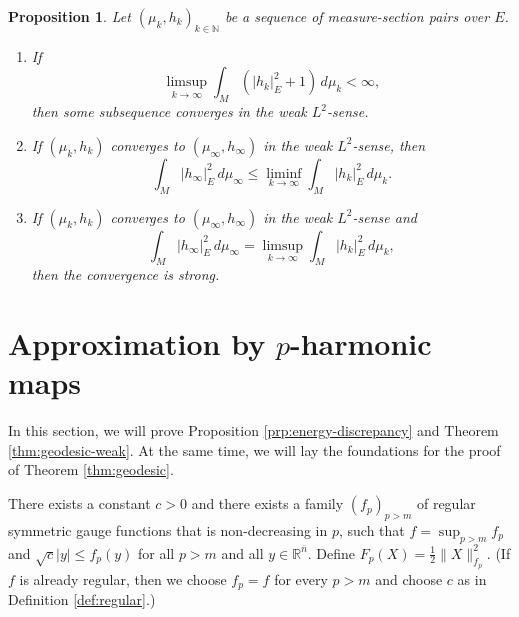\documentclass[10pt,a4paper]{amsart}
\newcommand{\R}{\mathbb{R}}
\newcommand{\N}{\mathbb{N}}
\newcommand{\ndim}{{\bar{n}}}
\newtheorem{proposition}[theorem]{Proposition}
\begin{document}
\begin{proposition} \label{prp:Hutchinson}
Let $(\mu_k, h_k)_{k \in \N}$ be a sequence of measure-section pairs over $E$.
\begin{enumerate}
\item If
\[
\limsup_{k \to \infty} \int_M (|h_k|_E^2 + 1) \, d\mu_k < \infty,
\]
then some subsequence converges in the weak $L^2$-sense.
\item If $(\mu_k, h_k)$ converges to $(\mu_\infty, h_\infty)$ in the weak
$L^2$-sense, then
\[
\int_M |h_\infty|_E^2 \, d\mu_\infty \le \liminf_{k \to \infty} \int_M |h_k|_E^2 \, d\mu_k.
\]
\item If $(\mu_k, h_k)$ converges to $(\mu_\infty, h_\infty)$ in the weak
$L^2$-sense and
\[
\int_M |h_\infty|_E^2 \, d\mu_\infty = \limsup_{k \to \infty} \int_M |h_k|_E^2 \, d\mu_k,
\]
then the convergence is strong.
\end{enumerate}
\end{proposition}















\section{Approximation by $p$-harmonic maps} \label{sct:construction}

In this section, we will prove Proposition \ref{prp:energy-discrepancy} and
Theorem \ref{thm:geodesic-weak}. At the same time, we will lay the
foundations for the proof of  Theorem \ref{thm:geodesic}.

There exists a constant $c > 0$ and there exists a family $(f_p)_{p > m}$ of regular symmetric gauge functions
that is non-decreasing in $p$, such that $f = \sup_{p > m} f_p$ and $\sqrt{c} |y| \le f_p(y)$ for all
$p > m$ and all $y \in \R^\ndim$. Define
$F_p(X) = \frac{1}{2} \|X\|_{f_p}^2$. (If $f$ is already regular, then we choose $f_p = f$ for every $p > m$
and choose $c$ as in Definition \ref{def:regular}.)
\end{document}

